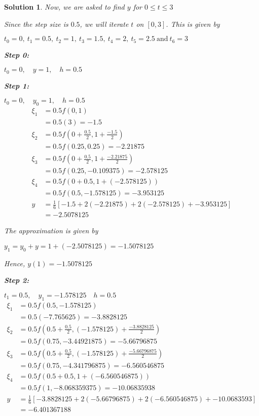 \documentclass[12pt,a4paper]{article}
\newtheorem{solution}[theorem]{Solution}
\begin{document}
\begin{solution}
Now, we are asked to find $y$ for $0\leq t \leq 3$

Since the step size is $0.5$, we will iterate $t$ on $\left[ 0,3 \right] $. This is given by 

$t_0 = 0, \: t_1 =0.5,\: t_2 = 1,\: t_3 = 1.5,\: t_4 = 2,\: t_5 = 2.5 \: \text{and} \: t_6 = 3$

\hspace{2pt}
\noindent
\textbf{Step 0:}

$t_0 = 0, \quad y= 1 , \quad h= 0.5$

\textbf{Step 1:}

$ t_0 = 0, \quad y_0 = 1, \quad h=0.5 $
\begin{align*}
\xi_1 &= 0.5f(0,1) \\
&= 0.5(3) = -1.5 \\
\xi_2 &= 0.5f\left( 0 + \frac{0.5}{2}, 1 + \frac{-1.5}{2} \right)  \\
&= 0.5f(0.25, 0.25) = -2.21875 \\
\xi_3 &= 0.5f\left( 0 + \frac{0.5}{2}, 1 + \frac{-2.21875}{2}\right)  \\
&= 0.5f(0.25, -0.109375) = -2.578125 \\
\xi_4 &= 0.5f(0+ 0.5, 1 +(-2.578125)) \\
&= 0.5f(0.5, -1.578125) = -3.953125\\
y &= \frac{1}{6} \left[ -1.5 + 2(-2.21875) + 2(-2.578125) + -3.953125 \right] \\
&= -2.5078125
\end{align*}

The approximation is given by 

$ y_1 = y_0 + y = 1 + (-2.5078125) = -1.5078125$

Hence, \quad $y(1) = -1.5078125$

\textbf{Step 2:}

$t_1 = 0.5, \quad y_1= -1.578125 \quad h=0.5 $
\begin{align*}
\xi_1 &= 0.5f(0.5,-1.578125) \\
&= 0.5(-7.765625) = -3.8828125 \\
\xi_2 &= 0.5f\left( 0.5 + \frac{0.5}{2}, (-1.578125) + \frac{-3.8828125}{2} \right)  \\
&= 0.5f(0.75, -3.44921875) = -5.66796875 \\
\xi_3 &= 0.5f\left( 0.5 + \frac{0.5}{2}, (-1.578125) + \frac{-5.66796875}{2}\right)  \\
&= 0.5f(0.75, -4.341796875) = -6.560546875 \\
\xi_4 &= 0.5f(0.5+ 0.5, 1 +(-6.560546875)) \\
&= 0.5f(1, -8.068359375) = -10.06835938\\
y &= \frac{1}{6} \left[ -3.8828125 + 2(-5.66796875) + 2(-6.560546875) + -10.0683593 \right] \\
&= -6.401367188
\end{align*}


\end{solution}
\end{document}
